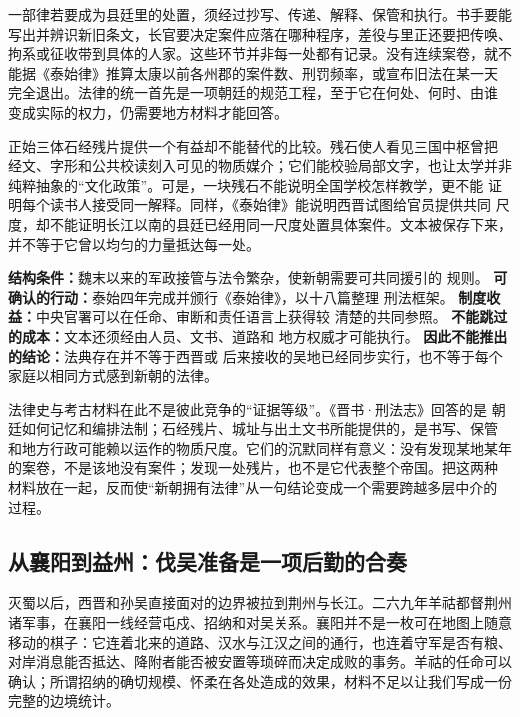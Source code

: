 一部律若要成为县廷里的处置，须经过抄写、传递、解释、保管和执行。书手要能
写出并辨识新旧条文，长官要决定案件应落在哪种程序，差役与里正还要把传唤、
拘系或征收带到具体的人家。这些环节并非每一处都有记录。没有连续案卷，就不
能据《泰始律》推算太康以前各州郡的案件数、刑罚频率，或宣布旧法在某一天
完全退出。法律的统一首先是一项朝廷的规范工程，至于它在何处、何时、由谁
变成实际的权力，仍需要地方材料才能回答。

正始三体石经残片提供一个有益却不能替代的比较。残石使人看见三国中枢曾把
经文、字形和公共校读刻入可见的物质媒介；它们能校验局部文字，也让太学并非
纯粹抽象的“文化政策”。可是，一块残石不能说明全国学校怎样教学，更不能
证明每个读书人接受同一解释。同样，《泰始律》能说明西晋试图给官员提供共同
尺度，却不能证明长江以南的县廷已经用同一尺度处置具体案件。文本被保存下来，
并不等于它曾以均匀的力量抵达每一处。

\begin{causalchain}
\textbf{结构条件：}魏末以来的军政接管与法令繁杂，使新朝需要可共同援引的
规则。 \textbf{可确认的行动：}泰始四年完成并颁行《泰始律》，以十八篇整理
刑法框架。 \textbf{制度收益：}中央官署可以在任命、审断和责任语言上获得较
清楚的共同参照。 \textbf{不能跳过的成本：}文本还须经由人员、文书、道路和
地方权威才可能执行。 \textbf{因此不能推出的结论：}法典存在并不等于西晋或
后来接收的吴地已经同步实行，也不等于每个家庭以相同方式感到新朝的法律。
\end{causalchain}

法律史与考古材料在此不是彼此竞争的“证据等级”。《晋书·刑法志》回答的是
朝廷如何记忆和编排法制；石经残片、城址与出土文书所能提供的，是书写、保管
和地方行政可能赖以运作的物质尺度。它们的沉默同样有意义：没有发现某地某年
的案卷，不是该地没有案件；发现一处残片，也不是它代表整个帝国。把这两种
材料放在一起，反而使“新朝拥有法律”从一句结论变成一个需要跨越多层中介的
过程。

\subsection{从襄阳到益州：伐吴准备是一项后勤的合奏}

灭蜀以后，西晋和孙吴直接面对的边界被拉到荆州与长江。二六九年羊祜都督荆州
诸军事，在襄阳一线经营屯戍、招纳和对吴关系。襄阳并不是一枚可在地图上随意
移动的棋子：它连着北来的道路、汉水与江汉之间的通行，也连着守军是否有粮、
对岸消息能否抵达、降附者能否被安置等琐碎而决定成败的事务。羊祜的任命可以
确认；所谓招纳的确切规模、怀柔在各处造成的效果，材料不足以让我们写成一份
完整的边境统计。

